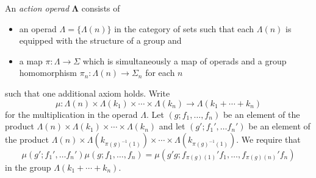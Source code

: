 \documentclass{amsbook} %
\newcommand{\mb}{\mathbf}
\newenvironment{eqn}{\begin{equation}}{\end{equation}}
\numberwithin{section}{chapter}
\begin{document}
\begin{Defi}\label{Defi:aop}
An \textit{action operad} $\mb{\Lambda}$\nomenclature[N]{$\mb{\Lambda}$}{action operad} consists of
\begin{itemize}
\item an operad $\Lambda = \{ \Lambda(n) \}$ in the category of sets such that each $\Lambda(n)$ is equipped with the structure of a group and
\item a map $\pi:\Lambda \rightarrow \Sigma$ which is simultaneously a map of operads and a group homomorphism $\pi_{n}:\Lambda(n) \rightarrow \Sigma_{n}$ for each $n$
\end{itemize}
such that one additional axiom holds.  Write
\[
\mu: \Lambda(n) \times \Lambda(k_{1}) \times \cdots \times \Lambda(k_{n}) \rightarrow \Lambda(k_{1} + \cdots + k_{n})
\]
for the multiplication in the operad $\Lambda$.  Let $(g; f_1, \ldots, f_n)$ be an element of the product $\Lambda(n) \times \Lambda(k_{1}) \times \cdots \times \Lambda(k_{n})$ and let $(g'; f_1', \ldots f_n')$ be an element of the product $\Lambda(n) \times \Lambda(k_{\pi(g)^{-1}(1)}) \times \cdots \times \Lambda(k_{\pi(g)^{-1}(1)})$.  We require that
\begin{eqn}\label{eqn:ao_axiom}
\mu(g'; f_1', \ldots f_n')  \mu(g; f_1, \ldots, f_n) = \mu (g'g; f_{\pi(g)(1)}'f_{1}, \ldots, f_{\pi(g)(n)}'f_{n})
\end{eqn}in the group $\Lambda(k_{1} + \cdots + k_{n})$.
\end{Defi}
\end{document}
